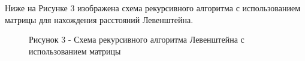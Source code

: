 \documentclass[12pt]{report}
\begin{document}
\newpage
Ниже на Рисунке 3 изображена схема рекурсивного алгоритма с использованием матрицы для нахождения расстояний Левенштейна.
\begin{figure}[h!]
	\caption*{Рисунок 3 - Схема рекурсивного алгоритма Левенштейна с использованием матрицы}
\end{figure}
\end{document}
